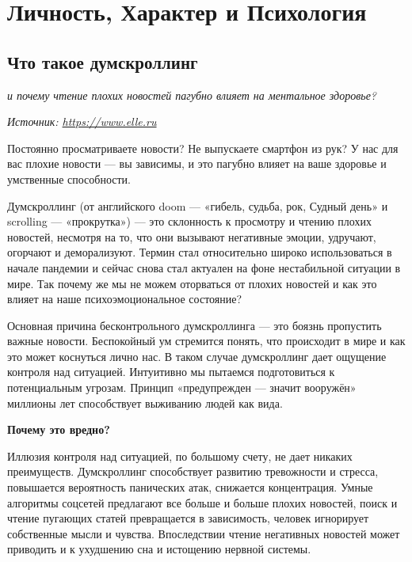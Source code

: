 \chapter{Личность, Характер и Психология}
\section{Что такое думскроллинг}

\textit{и почему чтение плохих новостей пагубно влияет на ментальное здоровье?}

\textit{Источник: \url{https://www.elle.ru}}

\begin{fancyquotes}
    Постоянно просматриваете новости? Не выпускаете смартфон из рук? У нас для вас плохие новости  ---  вы зависимы, и это пагубно влияет на ваше здоровье и умственные способности.
\end{fancyquotes}

Думскроллинг (от английского doom  ---  «гибель, судьба, рок, Судный день» и scrolling  ---  «прокрутка»)  ---  это склонность к просмотру и чтению плохих новостей, несмотря на то, что они вызывают негативные эмоции, удручают, огорчают и деморализуют. Термин стал относительно широко использоваться в начале пандемии и сейчас снова стал актуален на фоне нестабильной ситуации в мире. Так почему же мы не можем оторваться от плохих новостей и как это влияет на наше психоэмоциональное состояние?

Основная причина бесконтрольного думскроллинга  ---  это боязнь пропустить важные новости. Беспокойный ум стремится понять, что происходит в мире и как это может коснуться лично нас. В таком случае думскроллинг дает ощущение контроля над ситуацией. Интуитивно мы пытаемся подготовиться к потенциальным угрозам. Принцип «предупрежден  ---  значит вооружён» миллионы лет способствует выживанию людей как вида.

\textbf{Почему это вредно?}

Иллюзия контроля над ситуацией, по большому счету, не дает никаких преимуществ. Думскроллинг способствует развитию тревожности и стресса, повышается вероятность панических атак, снижается концентрация. Умные алгоритмы соцсетей предлагают все больше и больше плохих новостей, поиск и чтение пугающих статей превращается в зависимость, человек игнорирует собственные мысли и чувства. Впоследствии чтение негативных новостей может приводить и к ухудшению сна и истощению нервной системы.

